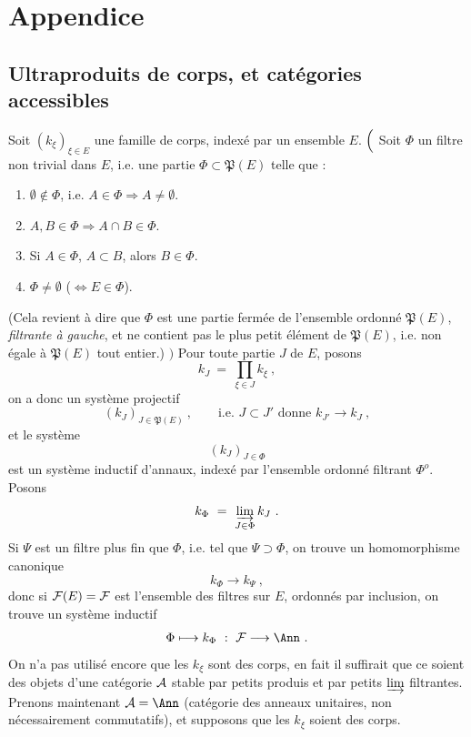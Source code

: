 \noindent



\section*{Appendice}

\subsection*{Ultraproduits de corps, et catégories accessibles}

\noindent Soit $(k_\xi)_{\xi\in E}$ une famille de corps, indexé par un ensemble $E$. $\Bigl($ Soit $\Phi$ un filtre non trivial dans $E$, i.e. une partie $\Phi\subset\mathfrak{P}(E)$ telle que :
\begin{enumerate}
\item[a)] $\emptyset\notin\Phi$, i.e. $A\in\Phi\Longrightarrow A\neq\emptyset$.
\item[b)] $A,B\in\Phi\Longrightarrow A\cap B\in\Phi$.
\item[c)] Si $A\in\Phi$, $A\subset B$, alors $B\in\Phi$.
\item[d)] $\Phi\neq\emptyset$ ($\iff E\in\Phi$).
\end{enumerate}
(Cela revient à dire que $\Phi$ est une partie fermée de l'ensemble ordonné $\mathfrak{P}(E)$, \textit{filtrante à gauche}, et ne contient pas le plus petit élément de $\mathfrak{P}(E)$, i.e. non égale à $\mathfrak{P}(E)$ tout entier.) $\Bigr)$ Pour toute partie $J$ de $E$, posons
\[
k_J \ = \ \prod_{\xi\in J} k_\xi \ ,
\]
on a donc un système projectif
\[
(k_J)_{J\in\mathfrak{P}(E)} \ , \qquad \text{i.e. } J\subset J' \text{ donne } k_{J'}\longrightarrow k_J \ ,
\]
et le système
\[
(k_J)_{J\in\Phi}
\]
est un système inductif d'annaux, indexé par l'ensemble ordonné filtrant $\Phi^o$. Posons %
\[
k_\Phi \ = \ \varinjlim_{J\in\Phi} k_J \ .
\]
Si $\Psi$ est un filtre plus fin que $\Phi$, i.e.
tel que $\Psi\supset\Phi$, on trouve un homomorphisme canonique
\[
k_\Phi \longrightarrow k_\Psi \ ,
\]
donc si $\mathcal{F}(E)=\mathcal{F}$ est l'ensemble des filtres sur $E$, ordonnés par inclusion, on trouve un système inductif
\[
\Phi \longmapsto k_\Phi \ : \ \cF \longrightarrow \Ann \ .
\]
On n'a pas utilisé encore que les $k_\xi$ sont des corps, en fait il suffirait que ce soient des objets d'une catégorie $\mathcal{A}$ stable par petits produis et par petits $\varinjlim$ filtrantes. Prenons maintenant $\cA=\Ann$ (catégorie des anneaux unitaires, non nécessairement commutatifs), et supposons que les $k_\xi$ soient des corps. %

